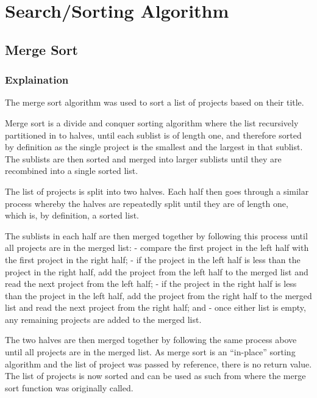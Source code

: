 \documentclass[
  english,
  a4paper,
,tablecaptionabove
]{scrartcl}
\begin{document}
\newpage

\hypertarget{searchsorting-algorithm}{%
\section{Search/Sorting Algorithm}\label{searchsorting-algorithm}}

\hypertarget{merge-sort}{%
\subsection{Merge Sort}\label{merge-sort}}

\hypertarget{explaination}{%
\subsubsection{Explaination}\label{explaination}}

The merge sort algorithm was used to sort a list of projects based on
their title.

Merge sort is a divide and conquer sorting algorithm where the list
recursively partitioned in to halves, until each sublist is of length
one, and therefore sorted by definition as the single project is the
smallest and the largest in that sublist. The sublists are then sorted
and merged into larger sublists until they are recombined into a single
sorted list.

The list of projects is split into two halves. Each half then goes
through a similar process whereby the halves are repeatedly split until
they are of length one, which is, by definition, a sorted list.

The sublists in each half are then merged together by following this
process until all projects are in the merged list: - compare the first
project in the left half with the first project in the right half; - if
the project in the left half is less than the project in the right half,
add the project from the left half to the merged list and read the next
project from the left half; - if the project in the right half is less
than the project in the left half, add the project from the right half
to the merged list and read the next project from the right half; and -
once either list is empty, any remaining projects are added to the
merged list.

The two halves are then merged together by following the same process
above until all projects are in the merged list. As merge sort is an
\enquote{in-place} sorting algorithm and the list of project was passed
by reference, there is no return value. The list of projects is now
sorted and can be used as such from where the merge sort function was
originally called.
\end{document}

